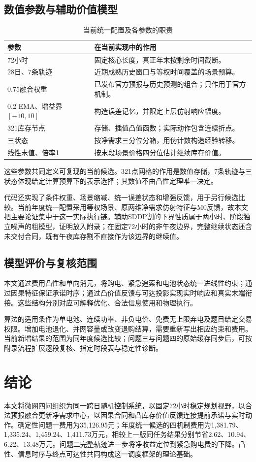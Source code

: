 \documentclass[UTF8,a4paper,zihao=-4,fontset=mac]{ctexart}
\begin{document}
\subsection{数值参数与辅助价值模型}
\begin{table}[H]\centering\small\caption{当前统一配置及各参数的职责}
\begin{tabular}{lp{10cm}}\toprule
参数&在当前实现中的作用\\\midrule
72小时&固定核心长度，真正年末按剩余时间截断。\\
28日、7条轨迹&近期成熟历史窗口与等权时间覆盖的场景预算。\\
0.75融合权重&已发布官方预报与历史预测的组合；只作用于官方机制。\\
0.2 EMA、增益界$[-10,10]$&构造误差记忆，并限定上层仿射响应幅度。\\
321库存节点&存储、插值凸值函数；实际动作包含连续折点。\\
三状态&按净需求三分位分箱，用伪计数构造经验转移。\\
线性末值、倍率1&按末段场景价格四分位估计继续库存价值。\\\bottomrule
\end{tabular}\end{table}
这些参数共同定义可复现的当前候选。321点网格的作用是数值存储，7条轨迹与三状态体现给定计算预算下的表示选择；其数值不由凸性定理唯一决定。

代码还实现了条件权重、场景缩减、统一误差状态和增强反馈，用于另行候选比较。当前年度统一配置采用等权场景、原两维净需求仿射特征与M0反馈，故本文把主要论证集中于这一实际执行链。辅助SDDP割的下界性质属于两小时、阶段独立噪声的粗模型，证明放入附录；在固定72小时的非午夜边界，完整继续状态还含未交付合同，既有午夜库存割不直接作为该边界的继续值。

\subsection{模型评价与复核范围}
本文通过费用凸性和单向消元，将购电、紧急追索和电池状态统一进线性约束；通过因果特征保证承诺时序；通过凸价值反馈与可达投影实现实时响应和真实末端衔接。这些结构分别对应可解释优化、合法信息使用和物理执行。

算法的适用条件为单电池、连续功率、非负电价、免费无上限弃电及题目给定交易权限。增加电池退化、并网容量或改变退购结算，需要重新写出相应约束和费用。当前新增结果的范围为同年度候选比较；问题三与问题四的原始缓存同步后，可按附录流程扩展逐段复核、指定时段表与稳定性诊断。

\section{结论}
本文将微网四问组织为同一跨日随机控制系统，以固定72小时稳定规划视野，以合法预报融合更新净需求中心，以因果合同和凸库存价值反馈连接提前承诺与实时动作。确定性问题一费用为35,126.95元；年度统一候选的四机制费用为1,381.79、1,335.24、1,459.24、1,411.73万元，相较上一版同任务结果分别节省2.62、10.94、6.22、13.48万元。问题二完整轨迹进一步将净收益定位到紧急购电费的下降。凸性、信息时序与终点可达性共同构成这一调度框架的理论基础。
\end{document}
